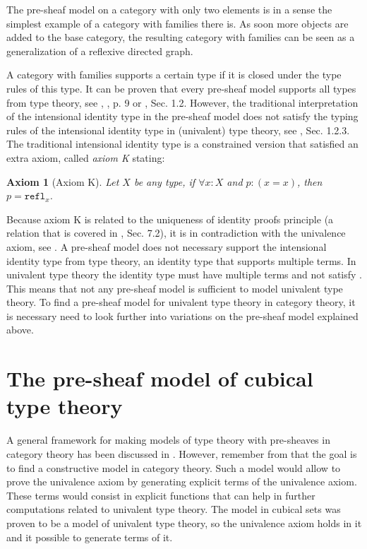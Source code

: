 \documentclass[12pt,a4paper,twoside,xetex]{book} %
\newcommand{\keyword}[1]{\emph{#1}\index{#1}}
\newtheorem{axiom}[theorem]{Axiom}
\newcommand{\op}[1]{\mathtt{#1}}
\begin{document}
The pre-sheaf model on a category with only two elements is in a sense the 
simplest example of a category with families there is. As soon more objects are 
added to the base category, the resulting category with families can be seen as 
a generalization of a reflexive directed graph. 

A category with families supports a certain type if it is closed under the type 
rules of this type.  It can be proven that every pre-sheaf model supports all 
types from type theory, see \cite{Hofmann1997}, \cite{Nuyts2018}, p. 9 or 
\cite{Huber2016}, Sec. 1.2. However, the traditional interpretation of the 
intensional identity type in the pre-sheaf model does not satisfy the typing 
rules of the intensional identity type in (univalent) type theory, see 
\cite{Huber2016}, Sec. 1.2.3. The traditional intensional identity type is a 
constrained version that satisfied an extra axiom, called \keyword{axiom K} 
stating: 

\begin{axiom}[Axiom K]\label{axiomk}
Let $X$ be any type, if $\forall x : X$ and $p : (x = x)$, then $p = 
\op{refl}_x$.  
\end{axiom}

Because axiom K is related to the uniqueness of identity proofs principle (a 
relation that is covered in \cite{Voevodsky2013}, Sec. 7.2), it is in 
contradiction with the univalence axiom, see . A pre-sheaf model 
does not necessary support the intensional identity type from type theory, an 
identity type that supports multiple terms. In univalent type theory the 
identity type must have multiple terms and not satisfy . This 
means that not any pre-sheaf model is sufficient to model univalent type theory. 
To find a pre-sheaf model for univalent type theory in category theory, it is 
necessary need to look further into variations on the pre-sheaf model explained 
above.  

\chapter{The pre-sheaf model of cubical type theory}\label{cubical}

A general framework for making models of type 
theory with pre-sheaves in category theory has been discussed in . However, remember from  that the goal is to find a constructive model in category theory. Such a model would allow to prove the univalence axiom by generating explicit terms of the univalence axiom. These terms would consist in explicit functions that can help in further computations related to univalent type theory. The model in cubical sets was proven to be a model of univalent type theory, so the univalence axiom holds in it and it possible 
to generate terms of it.  
\end{document}
